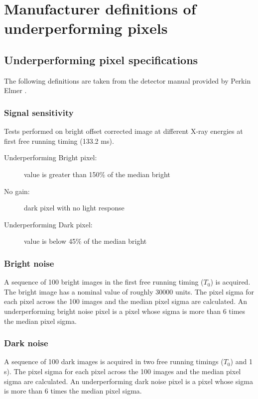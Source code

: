 \documentclass[\main/IO-Pixels.tex]{subfiles}
\begin{document}
\section{Manufacturer definitions of underperforming pixels}
\label{app:bpx-defn}

\subsection{Underperforming pixel specifications}

The following definitions are taken from the detector manual provided by Perkin Elmer \cite{PerkinElmerManual}. %

\subsubsection{Signal sensitivity}
Tests performed on bright offset corrected image at different X-ray energies at first free running timing (133.2 ms). 

\begin{description}

\item[Underperforming Bright pixel:] value is greater than 150\% of the median bright

\item[No gain:]  dark pixel with no light response 

\item[Underperforming Dark pixel:] value is below 45\% of the median bright

\end{description}

\subsubsection{Bright noise}
A sequence of 100 bright images in the first free running timing ($T_0$) is acquired. The bright image has a nominal value of roughly 30000 units. The pixel sigma for each pixel across the 100 images and the median pixel sigma are calculated. An underperforming bright noise pixel is a pixel whose sigma is more than 6 times the median pixel sigma.

\subsubsection{Dark noise}
A sequence of 100 dark images is acquired in two free running timings ($T_0$) and 1 s). The pixel sigma for each pixel across the 100 images and the median pixel sigma are calculated. An underperforming dark noise pixel is a pixel whose sigma is more than 6 times the median pixel sigma. 
\end{document}
